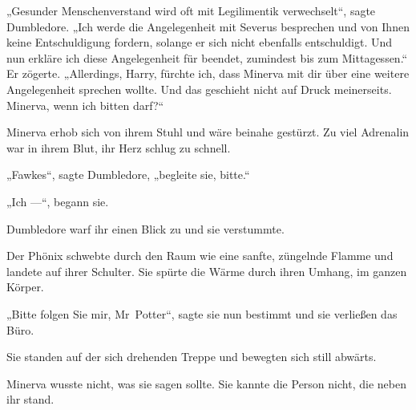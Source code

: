 „Gesunder Menschenverstand wird oft mit Legilimentik verwechselt“, sagte Dumbledore.
„Ich werde die Angelegenheit mit Severus besprechen und von Ihnen keine Entschuldigung fordern, solange er sich nicht ebenfalls entschuldigt. Und nun erkläre ich diese Angelegenheit für beendet, zumindest bis zum Mittagessen.“ Er zögerte.
„Allerdings, Harry, fürchte ich, dass Minerva mit dir über eine weitere Angelegenheit sprechen wollte. Und das geschieht nicht auf Druck meinerseits. Minerva, wenn ich bitten darf?“

Minerva erhob sich von ihrem Stuhl und wäre beinahe gestürzt. Zu viel Adrenalin war in ihrem Blut, ihr Herz schlug zu schnell.

„Fawkes“, sagte Dumbledore, „begleite sie, bitte.“

„Ich —“, begann sie.

Dumbledore warf ihr einen Blick zu und sie verstummte.

Der Phönix schwebte durch den Raum wie eine sanfte, züngelnde Flamme und landete auf ihrer Schulter. Sie spürte die Wärme durch ihren Umhang, im ganzen Körper.

„Bitte folgen Sie mir, Mr~Potter“, sagte sie nun bestimmt und sie verließen das Büro.

\later

Sie standen auf der sich drehenden Treppe und bewegten sich still abwärts.

Minerva wusste nicht, was sie sagen sollte. Sie kannte die Person nicht, die neben ihr stand.

